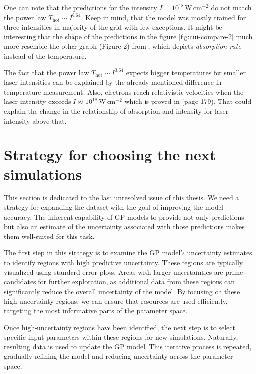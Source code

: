One can note that the predictions for the intensity $I = 10^{18} \, \mathrm{W} \, \mathrm{cm}^{-2}$ do not match the power law $T_\mathrm{hot} \sim I^{0.64}$. Keep in mind, that the model was mostly trained for three intensities in majority of the grid with few exceptions. It might be interesting that the shape of the predictions in the figure \ref{fig:cui-compare-2} much more resemble the other graph (Figure 2) from \cite{cui2013}, which depicts \textit{absorption rate} instead of the temperature.

The fact that the power law $T_\mathrm{hot} \sim I^{0.64}$ expects bigger temperatures for smaller laser intensities can be explained by the already mentioned difference in temperature measurement. Also, electrons reach relativistic velocities when the laser intensity exceeds $I \approx 10^{18} \, \mathrm{W} \, \mathrm{cm}^{-2}$ which is proved in \cite{gibbon2005} (page 179). That could explain the change in the relationship of absorption and intensity for laser intensity above that.



\section{Strategy for choosing the next simulations}

This section is dedicated to the last unresolved issue of this thesis. We need a strategy for expanding the dataset with the goal of improving the model accuracy. The inherent capability of GP models to provide not only predictions but also an estimate of the uncertainty associated with those predictions makes them well-suited for this task.

The first step in this strategy is to examine the GP model's uncertainty estimates to identify regions with high predictive uncertainty. These regions are typically visualized using standard error plots. Areas with larger uncertainties are prime candidates for further exploration, as additional data from these regions can significantly reduce the overall uncertainty of the model. By focusing on these high-uncertainty regions, we can ensure that resources are used efficiently, targeting the most informative parts of the parameter space.

Once high-uncertainty regions have been identified, the next step is to select specific input parameters within these regions for new simulations. Naturally, resulting data is used to update the GP model. This iterative process is repeated, gradually refining the model and reducing uncertainty across the parameter space.

